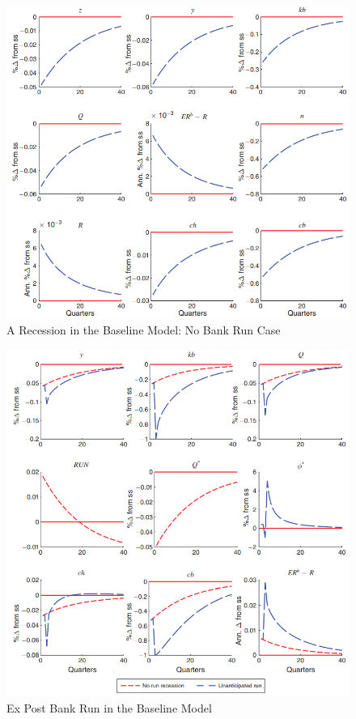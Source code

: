 \setcounter{figure}{2}

\begin{frame}
    \begin{figure}
        \centering
        \includegraphics[height = 0.9\textheight]{fig/fig3.png}
        \caption{A Recession in the Baseline Model: No Bank Run Case}
    \end{figure}
\end{frame}

\begin{frame}
    \begin{figure}
        \centering
        \includegraphics[height = 0.9\textheight]{fig/fig4.png}
        \caption{Ex Post Bank Run in the Baseline Model}
    \end{figure}
\end{frame}

